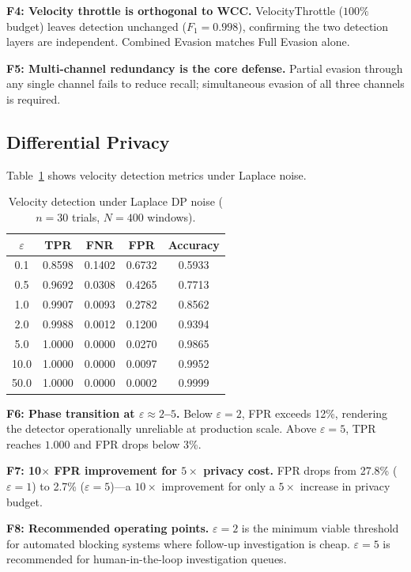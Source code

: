 \documentclass[sigconf,nonacm]{acmart}
\newcommand{\eps}{\varepsilon}
\begin{document}
\noindent\textbf{F4: Velocity throttle is orthogonal to WCC.}
VelocityThrottle ($100\%$ budget) leaves detection unchanged ($F_1 = 0.998$),
confirming the two detection layers are independent.  Combined Evasion
matches Full Evasion alone.

\noindent\textbf{F5: Multi-channel redundancy is the core defense.}
Partial evasion through any single channel fails to reduce recall;
simultaneous evasion of all three channels is required.

\subsection{Differential Privacy}

Table~\ref{tab:dp} shows velocity detection metrics under Laplace noise.

\begin{table}[h]
\caption{Velocity detection under Laplace DP noise ($n=30$ trials,
         $N=400$ windows).}
\label{tab:dp}
\centering
\begin{tabular}{ccccc}
\toprule
$\eps$ & TPR & FNR & FPR & Accuracy \\
\midrule
0.1  & 0.8598 & 0.1402 & 0.6732 & 0.5933 \\
0.5  & 0.9692 & 0.0308 & 0.4265 & 0.7713 \\
1.0  & 0.9907 & 0.0093 & 0.2782 & 0.8562 \\
2.0  & 0.9988 & 0.0012 & 0.1200 & 0.9394 \\
5.0  & 1.0000 & 0.0000 & 0.0270 & 0.9865 \\
10.0 & 1.0000 & 0.0000 & 0.0097 & 0.9952 \\
50.0 & 1.0000 & 0.0000 & 0.0002 & 0.9999 \\
\bottomrule
\end{tabular}
\end{table}

\noindent\textbf{F6: Phase transition at $\eps \approx 2$--$5$.}
Below $\eps = 2$, FPR exceeds 12\%, rendering the detector operationally
unreliable at production scale.  Above $\eps = 5$, TPR reaches $1.000$ and
FPR drops below 3\%.

\noindent\textbf{F7: 10$\times$ FPR improvement for $5\times$ privacy cost.}
FPR drops from 27.8\% ($\eps=1$) to 2.7\% ($\eps=5$)---a $10\times$
improvement for only a $5\times$ increase in privacy budget.

\noindent\textbf{F8: Recommended operating points.}
$\eps = 2$ is the minimum viable threshold for automated blocking systems
where follow-up investigation is cheap.  $\eps = 5$ is recommended for
human-in-the-loop investigation queues.
\end{document}
